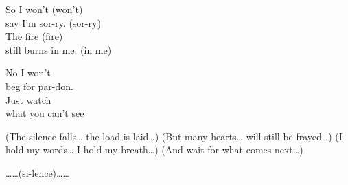 \begin{lyrics}
So I won't (won't)\\
say I'm sor-ry. (sor-ry)\\
The fire (fire)\\
still burns in me. (in me)

No I won't\\
beg for par-don.\\
Just watch\\
what you can't see

(The silence falls… the load is laid…)
(But many hearts… will still be frayed…)
(I hold my words… I hold my breath…)
(And wait for what comes next…)

……(si-lence)……
\end{lyrics}

